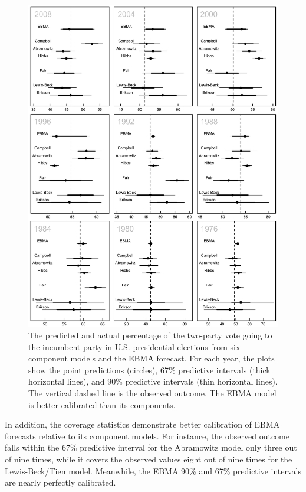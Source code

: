  \begin{figure}[ht!]
   \caption{\footnotesize The predicted and actual percentage of the
     two-party vote going to the incumbent party in U.S. presidential
     elections from six component models and the EBMA forecast.  For
     each year, the plots show the point predictions (circles), 67\%
     predictive intervals (thick horizontal lines), and 90\%
     predictive intervals (thin horizontal lines).  The vertical
     dashed line is the observed outcome.  The EBMA model is
   better calibrated than its components. }
 \label{PresPlots2}
 \begin{center}
 \includegraphics[width=5.6 in]{PresPlot2.PDF}
 \end{center}
 \end{figure}


 In addition, the coverage statistics demonstrate better calibration
 of EBMA forecasts relative to its component models.  For instance,
 the observed outcome falls within the 67\% predictive interval for
 the Abramowitz model only three out of nine times, while it covers the
 observed values eight out of nine times for the Lewis-Beck/Tien
 model.  Meanwhile, the EBMA 90\% and 67\% predictive intervals are
 nearly perfectly calibrated.

